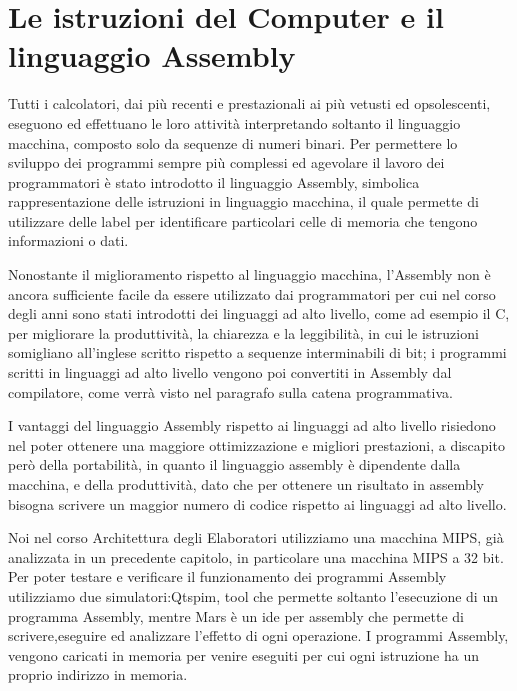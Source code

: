 \chapter{Le istruzioni del Computer e il linguaggio Assembly}
Tutti i calcolatori, dai più recenti e prestazionali ai più vetusti ed opsolescenti,
eseguono ed effettuano le loro attività interpretando soltanto il linguaggio macchina,
composto solo da sequenze di numeri binari.\newline
Per permettere lo sviluppo dei programmi sempre più complessi ed agevolare il lavoro
dei programmatori è stato introdotto il linguaggio Assembly, simbolica rappresentazione
delle istruzioni in linguaggio macchina, il quale permette di utilizzare delle label
per identificare particolari celle di memoria che tengono informazioni o dati.

Nonostante il miglioramento rispetto al linguaggio macchina, l'Assembly non è ancora
sufficiente facile da essere utilizzato dai programmatori per cui nel corso degli anni
sono stati introdotti dei linguaggi ad alto livello, come ad esempio il C,
per migliorare la produttività, la chiarezza e la leggibilità, in cui le istruzioni
somigliano all'inglese scritto rispetto a sequenze interminabili di bit; i programmi scritti
in linguaggi ad alto livello vengono poi convertiti in Assembly dal compilatore,
come verrà visto nel paragrafo sulla catena programmativa.

I vantaggi del linguaggio Assembly rispetto ai linguaggi ad alto livello risiedono
nel poter ottenere una maggiore ottimizzazione e migliori prestazioni, a discapito però
della portabilità, in quanto il linguaggio assembly è dipendente dalla macchina,
e della produttività, dato che per ottenere un risultato in assembly bisogna scrivere
un maggior numero di codice rispetto ai linguaggi ad alto livello.

Noi nel corso Architettura degli Elaboratori utilizziamo una macchina MIPS, già
analizzata in un precedente capitolo, in particolare una macchina MIPS a 32 bit.\newline
Per poter testare e verificare il funzionamento dei programmi Assembly utilizziamo
due simulatori:Qtspim, tool che permette soltanto l'esecuzione di un programma Assembly,
mentre Mars è un ide per assembly che permette di scrivere,eseguire ed analizzare l'effetto di ogni operazione.\newline
I programmi Assembly, vengono caricati in memoria per venire eseguiti per cui ogni istruzione
ha un proprio indirizzo in memoria.


